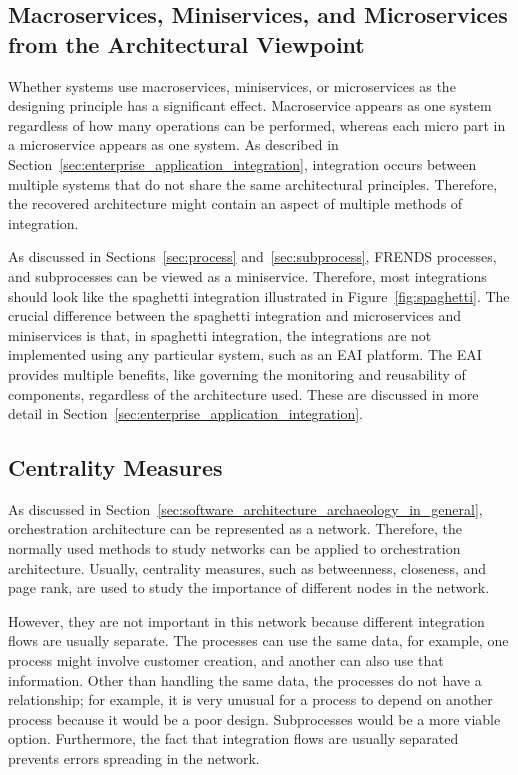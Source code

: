 \documentclass[english, 12pt, a4paper, sci, utf8, a-2b, online, obeyspaces]{aaltothesis}
\begin{document}
\subsection{Macroservices, Miniservices, and Microservices from the Architectural Viewpoint}
\label{sec:macro,mini,and_microservices_from_architectural_viewpoint}
Whether systems use macroservices, miniservices, or microservices as the designing principle has a significant effect. Macroservice appears as one system regardless of how many operations can be performed, whereas each micro part in a microservice appears as one system. As described in Section~\ref{sec:enterprise_application_integration}, integration occurs between multiple systems that do not share the same architectural principles. Therefore, the recovered architecture might contain an aspect of multiple methods of integration.

As discussed in Sections~\ref{sec:process} and~\ref{sec:subprocess}, FRENDS processes, and subprocesses can be viewed as a miniservice. Therefore, most integrations should look like the spaghetti integration illustrated in Figure~\ref{fig:spaghetti}. The crucial difference between the spaghetti integration and microservices and miniservices is that, in spaghetti integration, the integrations are not implemented using any particular system, such as an EAI platform. The EAI provides multiple benefits, like governing the monitoring and reusability of components, regardless of the architecture used. These are discussed in more detail in Section~\ref{sec:enterprise_application_integration}.

\subsection{Centrality Measures}
As discussed in Section~\ref{sec:software_architecture_archaeology_in_general}, orchestration architecture can be represented as a network. Therefore, the normally used methods to study networks can be applied to orchestration architecture. Usually, centrality measures, such as betweenness, closeness, and page rank, are used to study the importance of different nodes in the network.

However, they are not important in this network because different integration flows are usually separate. The processes can use the same data, for example, one process might involve customer creation, and another can also use that information. Other than handling the same data, the processes do not have a relationship; for example, it is very unusual for a process to depend on another process because it would be a poor design. Subprocesses would be a more viable option. Furthermore, the fact that integration flows are usually separated prevents errors spreading in the network.
\end{document}
